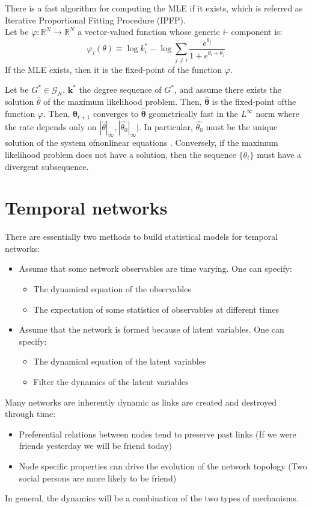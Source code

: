 There is a fast algorithm for computing the MLE if it exists, which is referred as Iterative Proportional Fitting Procedure (IPFP).\\
Let be $\varphi: \mathbb{R}^N \to \mathbb{R}^N$ a vector-valued function whose generic $i$- component is:
\[
\varphi_i(\mathbb{\theta})\equiv \log k_i^\ast - \log \sum_{j\neq i} \frac{e^{\theta_j}}{1 + e^{\theta_i + \theta_j}}
\]
If the MLE exists, then it is the fixed-point of the function $\varphi$.
\begin{mytheorem}
Let be $G^\ast \in \mathcal{G}_N$, $\mathbf{k}^\ast$ the degree sequence of $G^\ast$, and assume there exists the solution $\hat{\theta}$ of the maximum likelihood problem. Then, $\hat{\mathbf{\theta}}$ is the fixed-point ofthe function $\varphi$. Then, $\mathbf{\theta}_{t +1}$ converges to $\mathbf{\hat{\theta}}$ geometrically fast in the $L^\infty$ norm where the rate depends only on $|\hat{\theta}|_{\infty}, |\hat{\theta_0}|_{\infty}|$. In particular, $\hat{\theta_0}$ must be the unique solution of the system ofnonlinear equations . Conversely, if the maximum likelihood problem does not have a solution, then the sequence $\{\theta_t\}$ must have a divergent subsequence.
\end{mytheorem}
\section{Temporal networks}
There are essentially two methods to build statistical models for temporal networks:
\begin{itemize}
	\item Assume that some network observables are time varying. One can specify:
	\begin{itemize}
		\item The dynamical equation of the observables
		\item The expectation of some statistics of observables at different times
	\end{itemize}
\item Assume that the network is formed because of latent variables. One can specify:
\begin{itemize}
	\item The dynamical equation of the latent variables
	\item Filter the dynamics of the latent variables
\end{itemize}
\end{itemize}
Many networks are inherently dynamic as links are created and destroyed through time:
\begin{itemize}
	\item Preferential relations between nodes tend to preserve past links (If we were friends yesterday we will be friend today)
	\item Node specific properties can drive the evolution of the network topology (Two social persons are more likely to be friend)
\end{itemize}
In general, the dynamics will be a combination of the two types of mechanisms.
